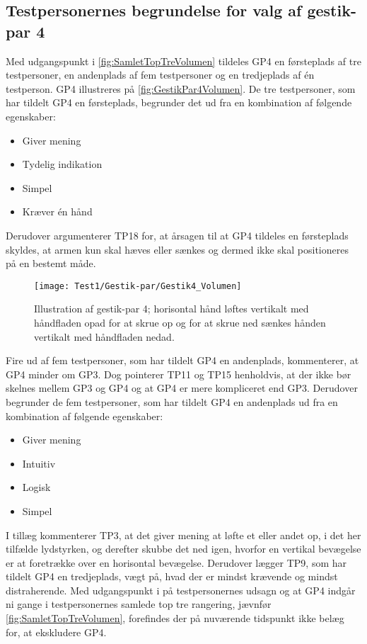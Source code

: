 \subsection{Testpersonernes begrundelse for valg af gestik-par 4}
\label{TestresultaterValgAfGestikkerBegrundelseGP4Volumen}
%
Med udgangspunkt i \autoref{fig:SamletTopTreVolumen} tildeles GP4 en førsteplads af tre testpersoner, en andenplads af fem testpersoner og en tredjeplads af én testperson. GP4 illustreres på \autoref{fig:GestikPar4Volumen}. De tre testpersoner, som har tildelt GP4 en førsteplads, begrunder det ud fra en kombination af følgende egenskaber: 
%
\begin{multicols}{3}
    \begin{itemize}
        \item Giver mening
        \item Tydelig indikation
        \item Simpel
        \item Kræver én hånd
\end{itemize}
\end{multicols}
\noindent
%
Derudover argumenterer TP18 for, at årsagen til at GP4 tildeles en førsteplads skyldes, at armen kun skal hæves eller sænkes og dermed ikke skal positioneres på en bestemt måde.
%
\begin{figure}[H]
	\centering
	\texttt{[image: Test1/Gestik-par/Gestik4\_Volumen]}
	\caption{Illustration af gestik-par 4; horisontal hånd løftes vertikalt med håndfladen opad for at skrue op og for at skrue ned sænkes hånden vertikalt med håndfladen nedad.}
	\label{fig:GestikPar4Volumen}
\end{figure}
\noindent
%
Fire ud af fem testpersoner, som har tildelt GP4 en andenplads, kommenterer, at GP4 minder om GP3. Dog pointerer TP11 og TP15 henholdvis, at der ikke bør skelnes mellem GP3 og GP4 og at GP4 er mere kompliceret end GP3. Derudover begrunder de fem testpersoner, som har tildelt GP4 en andenplads ud fra en kombination af følgende egenskaber: 
%
\begin{multicols}{3}
    \begin{itemize}
        \item Giver mening
        \item Intuitiv
        \item Logisk
        \item Simpel
\end{itemize}
\end{multicols}
\noindent
%
I tillæg kommenterer TP3, at det giver mening at løfte et eller andet op, i det her tilfælde lydstyrken, og derefter skubbe det ned igen, hvorfor en vertikal bevægelse er at foretrække over en horisontal bevægelse. Derudover lægger TP9, som har tildelt GP4 en tredjeplads, vægt på, hvad der er mindst krævende og mindst distraherende.\blankline 
%
Med udgangspunkt i på testpersonernes udsagn og at GP4 indgår ni gange i testpersonernes samlede top tre rangering, jævnfør \autoref{fig:SamletTopTreVolumen}, forefindes der på nuværende tidspunkt ikke belæg for, at ekskludere GP4.
%
